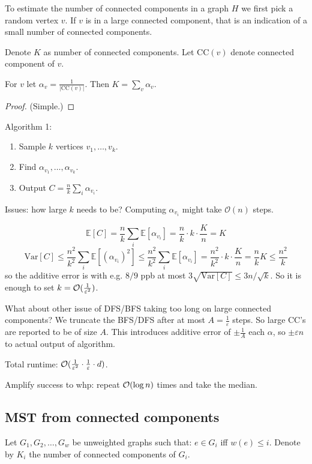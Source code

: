 \documentclass[11pt]{article}
\newcommand{\E}{{\mathbb E}}
\begin{document}
\begin{observation}
To estimate the number of connected components in a graph $H$ we first pick a random vertex $v$.
If $v$ is in a large connected component, that is an indication of a small number of connected components.
\end{observation}

Denote $K$ as number of connected components. Let $\text{CC}(v)$ denote connected component of $v$.

\begin{lemma}
For $v$ let $\alpha_v = \frac{1}{|\text{CC}(v)|}$. Then $K = \sum_v \alpha_v$.
\end{lemma}
\begin{proof} (Simple.)
\end{proof}

Algorithm 1:
\begin{enumerate}
\item Sample $k$ vertices $v_1,\ldots,v_k$.
\item Find $\alpha_{v_1},\ldots,\alpha_{v_k}$.
\item Output $C = \frac{n}{k} \sum_{i} \alpha_{v_i}$.
\end{enumerate}

Issues: how large $k$ needs to be? Computing $\alpha_{v_i}$ might take $\mathcal{O}(n)$ steps.

$$\E[C] = \frac{n}{k} \sum_{i} \E[\alpha_{v_i}] = \frac{n}{k} \cdot k \cdot \frac{K}{n} = K$$
$$\mathrm{Var}[C] \le \frac{n^2}{k^2} \sum_i \E[(\alpha_{v_i})^2] \le  \frac{n^2}{k^2} \sum_i \E[\alpha_{v_i}] = \frac{n^2}{k^2} \cdot k \cdot \frac{K}{n} = \frac{n}{k} K \le \frac{n^2}{k}$$
so the additive error is with e.g. $8/9$ ppb at most $3\sqrt{\mathrm{Var}[C]} \le  3n/\sqrt{k}$. So it is enough to set $k = \mathcal{O}(\frac{1}{\varepsilon^{2}})$.

What about other issue of DFS/BFS taking too long on large connected components? We truncate the BFS/DFS after at most $A = \frac{1}{\varepsilon}$ steps. So large CC's are reported to be of size $A$. This introduces additive error of $\pm \frac{1}{A}$ each $\alpha$, so $\pm \varepsilon n$ to actual output of algorithm.

Total runtime:
$\mathcal{O}(\frac{1}{\varepsilon^2} \cdot \frac{1}{\varepsilon} \cdot d)$.

Amplify success to whp: repeat $\mathcal{O}(\log n)$ times and take the median.

\subsection{MST from connected components}
Let $G_1,G_2,\ldots,G_w$ be unweighted graphs such that: $e \in G_i$ iff $w(e) \le i$. Denote by $K_i$ the number of connected components of $G_i$.
\end{document}
